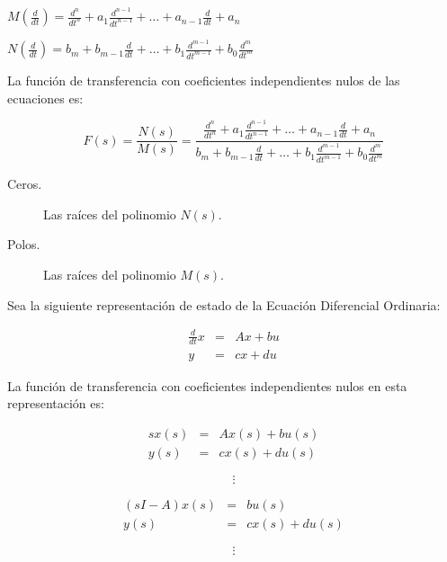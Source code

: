 \documentclass[12pt]{article}
\numberwithin{equation}{subsection}
\begin{document}
\begin{math}
M \left( \frac{d}{dt} \right) = \frac{d^n}{dt^n} + a_1 \frac{d^{n-1}}{dt^{n-1}} + \dots + a_{n-1} \frac{d}{dt} + a_n
\end{math}

\begin{math}
N \left( \frac{d}{dt} \right) = b_m + b_{m-1} \frac{d}{dt} + \dots + b_1 \frac{d^{m-1}}{dt^{m-1}} + b_0 \frac{d^m}{dt^m}
\end{math}

La función de transferencia con coeficientes independientes nulos de las ecuaciones es:

\begin{equation}
F(s) = \frac{N(s)}{M(s)} = \frac{\frac{d^n}{dt^n} + a_1 \frac{d^{n-1}}{dt^{n-1}} + \dots + a_{n-1} \frac{d}{dt} + a_n}{b_m + b_{m-1} \frac{d}{dt} + \dots + b_1 \frac{d^{m-1}}{dt^{m-1}} + b_0 \frac{d^m}{dt^m}}
\end{equation}

\begin{description}
\item [Ceros.] Las raíces del polinomio $N(s)$.
\item [Polos.] Las raíces del polinomio $M(s)$.
\end{description}

Sea la siguiente representación de estado de la Ecuación Diferencial Ordinaria:

\begin{eqnarray}
\frac{d}{dt} x & = & A x + b u \nonumber \\
y & = & c x + d u \nonumber
\end{eqnarray}

La función de transferencia con coeficientes independientes nulos en esta representación es:

\begin{eqnarray}
s x(s) & = & A x(s) + b u(s) \nonumber \\
y(s) & = & c x(s) + d u(s) \nonumber
\end{eqnarray}

\begin{equation}
\vdots \nonumber
\end{equation}

\begin{eqnarray}
(s I - A) x(s) & = & b u(s) \nonumber \\
y(s) & = & c x(s) + d u(s) \nonumber
\end{eqnarray}

\begin{equation}
\vdots \nonumber
\end{equation}
\end{document}
